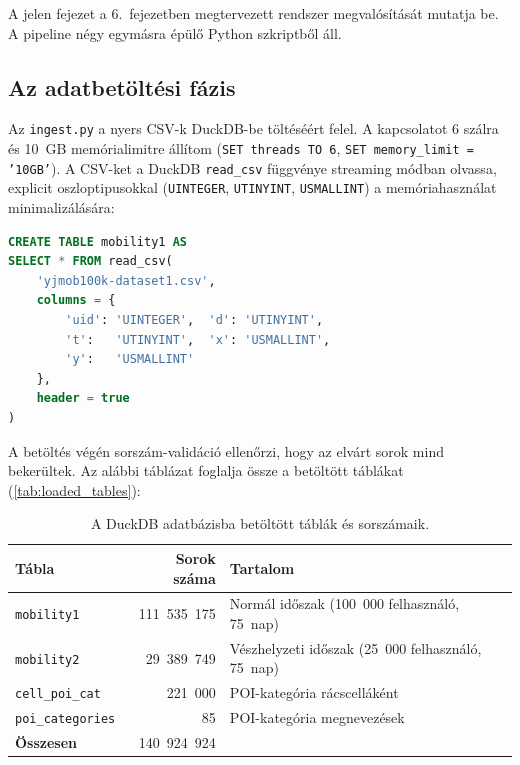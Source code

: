 
A jelen fejezet a 6.\ fejezetben megtervezett rendszer megvalósítását mutatja be. A pipeline négy egymásra épülő Python szkriptből áll.

\subsection{Az adatbetöltési fázis}

Az \texttt{ingest.py} a nyers CSV-k DuckDB-be töltéséért felel. A kapcsolatot 6 szálra és 10~GB memórialimitre állítom (\texttt{SET threads TO 6}, \texttt{SET memory\_limit = '10GB'}). A CSV-ket a DuckDB \texttt{read\_csv} függvénye streaming módban olvassa, explicit oszloptipusokkal (\texttt{UINTEGER}, \texttt{UTINYINT}, \texttt{USMALLINT}) a memóriahasználat minimalizálására:

\begin{lstlisting}[language=SQL, caption={A \texttt{mobility1} tábla létrehozása streaming CSV-olvasással.}, label={lst:mobility_load}, basicstyle=\small\ttfamily, breaklines=true, frame=single]
CREATE TABLE mobility1 AS
SELECT * FROM read_csv(
    'yjmob100k-dataset1.csv',
    columns = {
        'uid': 'UINTEGER',  'd': 'UTINYINT',
        't':   'UTINYINT',  'x': 'USMALLINT',
        'y':   'USMALLINT'
    },
    header = true
)
\end{lstlisting}

A betöltés végén sorszám-validáció ellenőrzi, hogy az elvárt sorok mind bekerültek. Az alábbi táblázat foglalja össze a betöltött táblákat (\autoref{tab:loaded_tables}):

\begin{table}[H]
\centering
\caption{A DuckDB adatbázisba betöltött táblák és sorszámaik.}
\label{tab:loaded_tables}
\begin{tabular}{l r l}
\hline
\textbf{Tábla} & \textbf{Sorok száma} & \textbf{Tartalom} \\
\hline
\texttt{mobility1}       & 111~535~175 & Normál időszak (100~000 felhasználó, 75~nap) \\
\texttt{mobility2}       &  29~389~749 & Vészhelyzeti időszak (25~000 felhasználó, 75~nap) \\
\texttt{cell\_poi\_cat}  &    221~000  & POI-kategória rácscelláként \\
\texttt{poi\_categories} &         85 & POI-kategória megnevezések \\
\hline
\textbf{Összesen}        & 140~924~924 & \\
\hline
\end{tabular}
\end{table}

